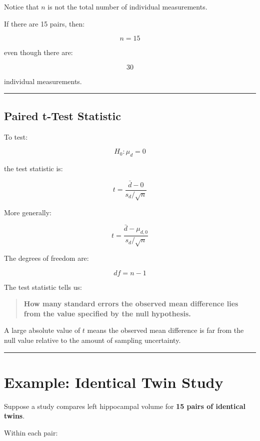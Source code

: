 \documentclass[
  letterpaper,
  DIV=11,
  numbers=noendperiod]{scrreprt}
\begin{document}
Notice that \(n\) is not the total number of individual measurements.

If there are 15 pairs, then:

\[
n=15
\]

even though there are:

\[
30
\]

individual measurements.

\begin{center}\rule{0.5\linewidth}{0.5pt}\end{center}

\section{Paired t-Test Statistic}\label{paired-t-test-statistic}

To test:

\[
H_0:\mu_d=0
\]

the test statistic is:

\[
\boxed{
t=
\frac{\bar{d}-0}
{s_d/\sqrt{n}}
}
\]

More generally:

\[
t=
\frac{\bar{d}-\mu_{d,0}}
{s_d/\sqrt{n}}
\]

The degrees of freedom are:

\[
df=n-1
\]

The test statistic tells us:

\begin{quote}
\textbf{How many standard errors the observed mean difference lies from
the value specified by the null hypothesis.}
\end{quote}

A large absolute value of \(t\) means the observed mean difference is
far from the null value relative to the amount of sampling uncertainty.

\begin{center}\rule{0.5\linewidth}{0.5pt}\end{center}


\chapter{Example: Identical Twin
Study}\label{example-identical-twin-study}

Suppose a study compares left hippocampal volume for \textbf{15 pairs of
identical twins}.

Within each pair:
\end{document}
